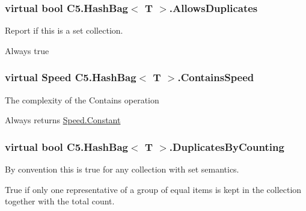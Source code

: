 \subsubsection[{Allows\+Duplicates}]{\setlength{\rightskip}{0pt plus 5cm}virtual bool {\bf C5.\+Hash\+Bag}$<$ T $>$.Allows\+Duplicates\hspace{0.3cm}{\ttfamily [get]}}\label{class_c5_1_1_hash_bag_a1aee5b97f3bf34a9c75838848aeff1fa}


Report if this is a set collection. 

Always true\hypertarget{class_c5_1_1_hash_bag_aa3fed46c7ca11098f330ad791da98c31}{}
\subsubsection[{Contains\+Speed}]{\setlength{\rightskip}{0pt plus 5cm}virtual {\bf Speed} {\bf C5.\+Hash\+Bag}$<$ T $>$.Contains\+Speed\hspace{0.3cm}{\ttfamily [get]}}\label{class_c5_1_1_hash_bag_aa3fed46c7ca11098f330ad791da98c31}


The complexity of the Contains operation 

Always returns \hyperlink{namespace_c5_a615ba88dcdaa8d5a3c5f833a73d7fad6acb17869fe51048b5a5c4c6106551a255}{Speed.\+Constant}\hypertarget{class_c5_1_1_hash_bag_a868b4e2fa4bdf260e0cd22663b313267}{}
\subsubsection[{Duplicates\+By\+Counting}]{\setlength{\rightskip}{0pt plus 5cm}virtual bool {\bf C5.\+Hash\+Bag}$<$ T $>$.Duplicates\+By\+Counting\hspace{0.3cm}{\ttfamily [get]}}\label{class_c5_1_1_hash_bag_a868b4e2fa4bdf260e0cd22663b313267}


By convention this is true for any collection with set semantics. 

True if only one representative of a group of equal items is kept in the collection together with the total count.\hypertarget{class_c5_1_1_hash_bag_a676d1112960f86055de24540992f6310}{}

